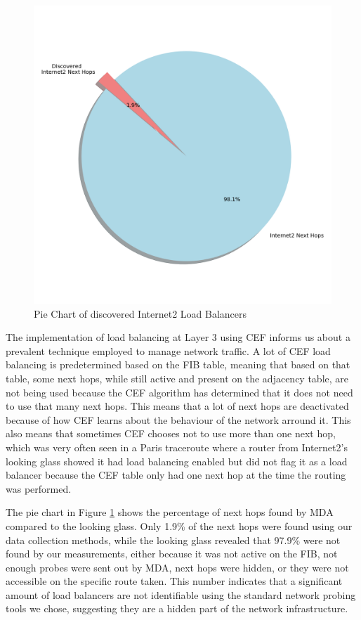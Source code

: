 \documentclass[12pt]{cwru_thesis}
\begin{document}
\begin{figure}[h!]
    \centering
    \includegraphics[width=\linewidth]{figures/Internet2_next_hops_pie_chart.png}
    \caption{Pie Chart of discovered Internet2 Load Balancers}
    \label{fig:pie_chart_Internet2}
\end{figure}

The implementation of load balancing at Layer 3 using CEF informs us about a prevalent technique employed to manage network traffic. A lot of CEF load balancing is predetermined based on the FIB table, meaning that based on that table, some next hops, while still active and present on the adjacency table, are not being used because the CEF algorithm has determined that it does not need to use that many next hops. This means that a lot of next hops are deactivated because of how CEF learns about the behaviour of the network arround it. This also means that sometimes CEF chooses not to use more than one next hop, which was very often seen in a Paris traceroute where a router from Internet2's looking glass showed it had load balancing enabled but did not flag it as a load balancer because the CEF table only had one next hop at the time the routing was performed.

The pie chart in Figure \ref{fig:pie_chart_Internet2} shows the percentage of next hops found by MDA compared to the looking glass. Only 1.9\% of the next hops were found using our data collection methods, while the looking glass revealed that 97.9\% were not found by our measurements, either because it was not active on the FIB, not enough probes were sent out by MDA, next hops were hidden, or they were not accessible on the specific route taken. This number indicates that a significant amount of load balancers are not identifiable using the standard network probing tools we chose, suggesting they are a hidden part of the network infrastructure.
\end{document}
